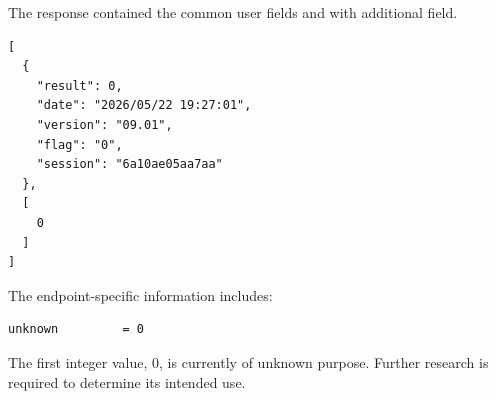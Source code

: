 The response contained the common user fields and with additional field.

\begin{lstlisting}
[
  {
    "result": 0,
    "date": "2026/05/22 19:27:01",
    "version": "09.01",
    "flag": "0",
    "session": "6a10ae05aa7aa"
  },
  [
    0
  ]
]
\end{lstlisting}

The endpoint-specific information includes:

\begin{lstlisting}
unknown         = 0
\end{lstlisting}

\begin{tcolorbox}[colback=yellow!10,colframe=orange!80!black,title=Warning]
The first integer value, $0$, is currently of unknown purpose.
Further research is required to determine its intended use.
\end{tcolorbox}

\newpage